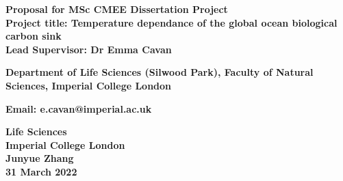 \begin{titlepage}
    \begin{center}
        \vspace*{1cm}
            
        \Huge
        \textbf{Proposal for MSc CMEE Dissertation Project}\\
        \textbf{Project title: Temperature dependance of the global ocean biological carbon sink}\\
        
        \vspace{2cm}
        \textbf{Lead Supervisor: Dr Emma Cavan}
        
        \textbf{Department of Life Sciences (Silwood Park), Faculty of Natural Sciences, Imperial College London}
        
        \textbf{Email: e.cavan@imperial.ac.uk}
        
        
            
        \vfill
            
        
        
        \vspace{0.8cm}
            
        \Large
        \textbf{Life Sciences}\\
        \textbf{Imperial College London}\\
        \textbf{Junyue Zhang}\\
        \textbf{31 March 2022}\\
        
    
            
    \end{center}
\end{titlepage}